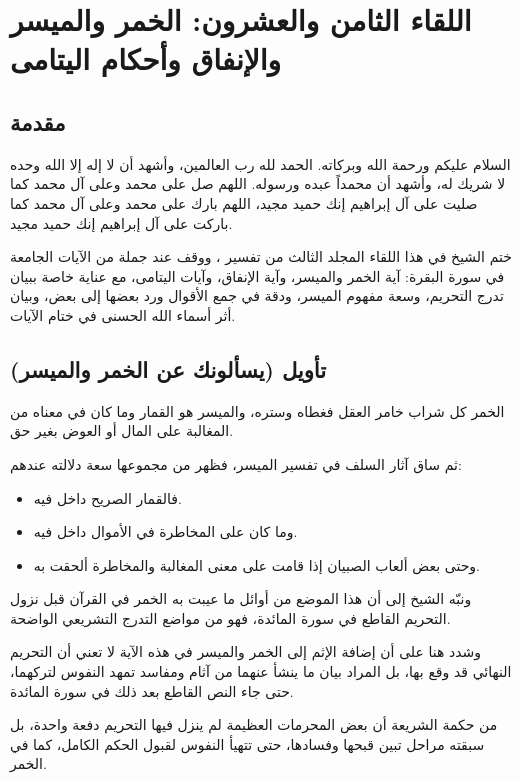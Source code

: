 \chapter{اللقاء الثامن والعشرون: الخمر والميسر والإنفاق وأحكام اليتامى}

\section{مقدمة}
السلام عليكم ورحمة الله وبركاته. الحمد لله رب العالمين، وأشهد أن لا إله إلا الله وحده لا شريك له، وأشهد أن محمداً عبده ورسوله. اللهم صل على محمد وعلى آل محمد كما صليت على آل إبراهيم إنك حميد مجيد، اللهم بارك على محمد وعلى آل محمد كما باركت على آل إبراهيم إنك حميد مجيد.

ختم الشيخ في هذا اللقاء المجلد الثالث من تفسير ، ووقف عند جملة من الآيات الجامعة في سورة البقرة: آية الخمر والميسر، وآية الإنفاق، وآيات اليتامى، مع عناية خاصة ببيان تدرج التحريم، وسعة مفهوم الميسر، ودقة  في جمع الأقوال ورد بعضها إلى بعض، وبيان أثر أسماء الله الحسنى في ختام الآيات.

\separator

\section{تأويل (يسألونك عن الخمر والميسر)}
 الخمر كل شراب خامر العقل فغطاه وستره، والميسر هو القمار وما كان في معناه من المغالبة على المال أو العوض بغير حق.

ثم ساق  آثار السلف في تفسير الميسر، فظهر من مجموعها سعة دلالته عندهم:
\begin{itemize}
    \item فالقمار الصريح داخل فيه.
    \item وما كان على المخاطرة في الأموال داخل فيه.
    \item وحتى بعض ألعاب الصبيان إذا قامت على معنى المغالبة والمخاطرة ألحقت به.
\end{itemize}

ونبّه الشيخ إلى أن هذا الموضع من أوائل ما عيبت به الخمر في القرآن قبل نزول التحريم القاطع في سورة المائدة، فهو من مواضع التدرج التشريعي الواضحة.

وشدد هنا على أن إضافة الإثم إلى الخمر والميسر في هذه الآية لا تعني أن التحريم النهائي قد وقع بها، بل المراد بيان ما ينشأ عنهما من آثام ومفاسد تمهد النفوس لتركهما، حتى جاء النص القاطع بعد ذلك في سورة المائدة.

\begin{fawaid}
من حكمة الشريعة أن بعض المحرمات العظيمة لم ينزل فيها التحريم دفعة واحدة، بل سبقته مراحل تبين قبحها وفسادها، حتى تتهيأ النفوس لقبول الحكم الكامل، كما في الخمر.
\end{fawaid}

